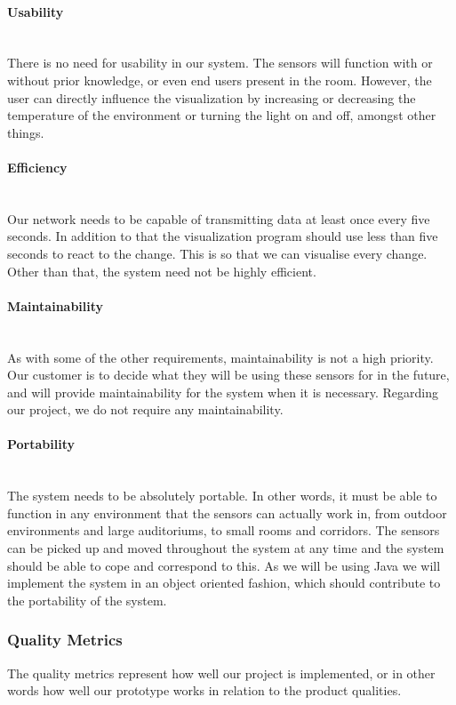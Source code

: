 \documentclass[../document.tex]{subfiles}
\begin{document}
\paragraph{Usability} \ \\
There is no need for usability in our system. The sensors will function with or without prior knowledge, or even end users present in the room. However, the user can directly influence the visualization by increasing or decreasing the temperature of the environment or turning the light on and off, amongst other things.

\paragraph{Efficiency} \ \\
Our network needs to be capable of transmitting data at least once every five seconds. In addition to that the visualization program should use less than five seconds to react to the change. This is so that we can visualise every change. Other than that, the system need not be highly efficient.

\paragraph{Maintainability} \ \\
As with some of the other requirements, maintainability is not a high priority. Our customer is to decide what they will be using these sensors for in the future, and will provide maintainability for the system when it is necessary. Regarding our project, we do not require any maintainability.

\paragraph{Portability} \ \\
The system needs to be absolutely portable. In other words, it must be able to function in any environment that the sensors can actually work in, from outdoor environments and large auditoriums, to small rooms and corridors. The sensors can be picked up and moved throughout the system at any time and the system should be able to cope and correspond to this. As we will be using Java we will implement the system in an object oriented fashion, which should contribute to the portability of the system.

\subsubsection{Quality Metrics}
The quality metrics represent how well our project is implemented, or in other words how well our prototype works in relation to the product qualities.
\end{document}
